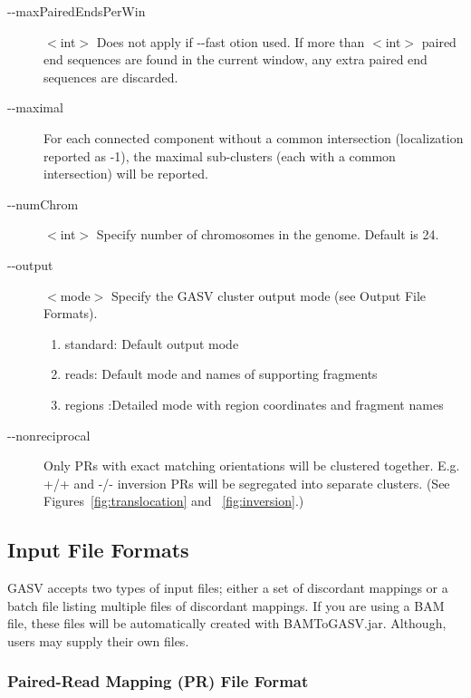 \documentclass[11pt]{article}
\begin{document}
\begin{description}
  \item[-{}-maxPairedEndsPerWin]  $<$int$>$ Does not apply if -{}-fast otion used.
				If more than $<$int$>$ paired end sequences are
				found in the current window, any extra
				paired end sequences are discarded.
 \item[-{}-maximal]  For each
                                connected component without a common
                                intersection (localization reported as
                                -1), the maximal sub-clusters (each
                                with a common intersection) will be 
				reported.

      \item[-{}-numChrom]      $<$int$>$ 	Specify number of chromosomes in the 
				genome. Default is 24. 
 \item[-{}-output]   $<$mode$>$	 Specify the GASV cluster output mode (see Output File Formats).
				\begin{enumerate}
                                \item standard:	Default output mode
                                \item reads: Default mode and names of
						supporting fragments
                               \item regions :Detailed mode with region coordinates and fragment names 
                               \end{enumerate} 
 \item[-{}-nonreciprocal]  Only PRs with exact matching orientations 
				will be clustered together.  E.g. +/+ and 
				-/- inversion PRs will be segregated into 
				separate clusters. (See Figures~\ref{fig:translocation} and ~\ref{fig:inversion}.)

\end{description}

\subsection{Input File Formats}

GASV accepts two types of input files; either a set of discordant mappings or a batch file listing multiple files of discordant mappings. If you are using a BAM file, these files will be automatically created with BAMToGASV.jar. Although, users may supply their own files. 

\subsubsection{Paired-Read Mapping (PR) File Format}
\end{document}
